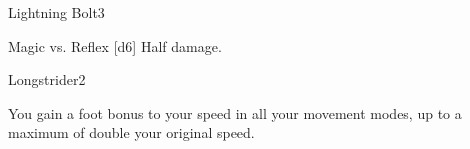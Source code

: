 \begin{spellsection}{Lightning Bolt}{3}
    \begin{spellheader}
    \end{spellheader}
    \begin{spellcontent}
        \begin{spelltargetinginfo}
        \end{spelltargetinginfo}
        \begin{spelleffects}
            \begin{spellattack}{Magic vs. Reflex}
                \spellsuccess {}[d6]
                \spellfailure Half damage.
            \end{spellattack}
        \end{spelleffects}
    \end{spellcontent}
    \begin{spellfooter}
        \spellnotes \destructivespellnotes
        \miscastexplode
    \end{spellfooter}
\end{spellsection}

\begin{spellsection}{Longstrider}{2}
    \begin{spellheader}
    \end{spellheader}
    \begin{spellcontent}
        \begin{spelltargetinginfo}
        \end{spelltargetinginfo}
        \begin{spelleffects}
            \spelleffect You gain a  foot bonus to your speed in all your movement modes, up to a maximum of double your original speed.
            \spelldur \durlong \dismissable
        \end{spelleffects}
    \end{spellcontent}
    \begin{spellfooter}
        \miscastexplode
    \end{spellfooter}
\end{spellsection}


